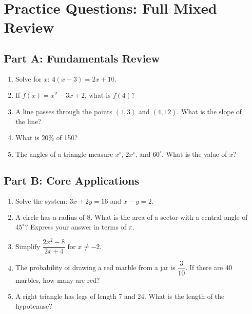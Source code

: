 \documentclass[14pt]{extarticle}
\begin{document}
\newpage

\section*{Practice Questions: Full Mixed Review}

\subsection*{Part A: Fundamentals Review}
\begin{enumerate}
  \item Solve for \(x\): \(4(x - 3) = 2x + 10\).
  \item If \(f(x) = x^2 - 3x + 2\), what is \(f(4)\)?
  \item A line passes through the points \((1, 3)\) and \((4, 12)\). What is the slope of the line?
  \item What is \(20\%\) of 150?
  \item The angles of a triangle measure \(x^\circ\), \(2x^\circ\), and \(60^\circ\). What is the value of \(x\)?
\end{enumerate}

\subsection*{Part B: Core Applications}
\begin{enumerate}
  \item Solve the system: \(3x + 2y = 16\) and \(x - y = 2\).
  \item A circle has a radius of 8. What is the area of a sector with a central angle of \(45^\circ\)? Express your answer in terms of \(\pi\).
  \item Simplify \(\dfrac{2x^2 - 8}{2x + 4}\) for \(x \neq -2\).
  \item The probability of drawing a red marble from a jar is \(\dfrac{3}{10}\). If there are 40 marbles, how many are red?
  \item A right triangle has legs of length 7 and 24. What is the length of the hypotenuse?
\end{enumerate}
\end{document}
